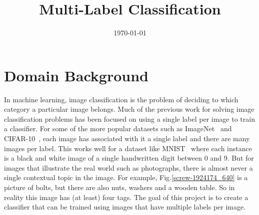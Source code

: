 \documentclass[10pt, a4paper, twocolumn]{article} %
\title{Multi-Label Classification} %
\author{
	\authorstyle{Willie Maddox} %
}
\date{\today} %
\begin{document}
\maketitle %

\thispagestyle{firstpage} %




\section{Domain Background}\label{sec:1} %


In machine learning, image classification is the problem of deciding to which category a particular image belongs. Much of the previous work for solving image classification problems has been focused on using a single label per image to train a classifier.  For some of the more popular datasets such as ImageNet~\cite{ILSVRC15} and CIFAR-10~\cite{Krizhevsky2009}, each image has associated with it a single label and there are many images per label. This works well for a dataset like MNIST~\cite{mnist} where each instance is a black and white image of a single handwritten digit  between 0 and 9.  But for images that illustrate the real world such as photographs, there is almost never a single contextual topic in the image. For example, Fig.\ref{screw-1924174_640} is a picture of bolts, but there are also nuts, washers and a wooden table.  So in reality this image has (at least) four tags.  The goal of this project is to create a classifier that can be trained using images that have multiple labels per image.
\end{document}
